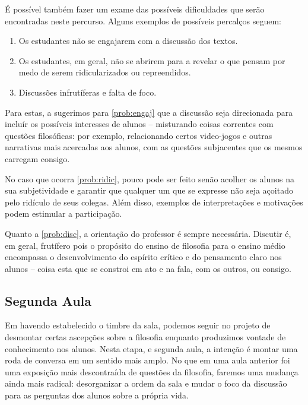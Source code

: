 \documentclass[12pt,a4paper]{article}
\begin{document}
	É possível também fazer um exame das possíveis dificuldades 
	que serão encontradas neste percurso. Alguns exemplos de possíveis 
	percalços seguem:

	\begin{enumerate}[label=\alph*)]
		\item	\label{prob:engaj} 
			Os estudantes não se engajarem com a discussão 
			dos textos.

		\item	\label{prob:ridic}
			Os estudantes, em geral, não se abrirem para a 
			revelar o que pensam por medo de serem ridicularizados
			ou repreendidos.

		\item	\label{prob:disc}
			Discussões infrutíferas e falta de foco.
	\end{enumerate}
	
	Para estas, a sugerimos para \ref{prob:engaj} que a discussão
	seja direcionada para incluír os possíveis interesses de alunos
	-- misturando coisas correntes com questões filosóficas: por
	exemplo, relacionando certos video-jogos e outras narrativas 
	mais acercadas aos alunos, com as questões subjacentes que os 
	mesmos carregam consigo. 
	
	No caso que ocorra \ref{prob:ridic}, pouco pode ser feito senão
	acolher os alunos na sua subjetividade e garantir que qualquer 
	um que se expresse não seja açoitado pelo ridículo de seus 
	colegas. Além disso, exemplos de interpretações e motivações 
	podem estimular a participação.

	Quanto a \ref{prob:disc}, a orientação do professor é sempre
	necessária. Discutir é, em geral, frutífero pois o propósito
	do ensino de filosofia para o ensino médio encompassa o 
	desenvolvimento do espírito crítico e do pensamento claro nos 
	alunos -- coisa esta que se constroi em ato e na fala, com os 
	outros, ou consigo.

	\subsection*{Segunda Aula}

	Em havendo estabelecido o timbre da sala, podemos seguir no 
	projeto de desmontar certas ascepções sobre a filosofia 
	enquanto produzimos vontade de conhecimento nos alunos. Nesta
	etapa, e segunda aula, a intenção é montar uma roda de conversa
	em um sentido mais amplo. No que em uma aula anterior foi uma 
	exposição mais descontraída de questões da filosofia, faremos 
	uma mudança ainda mais radical: desorganizar a ordem da sala e 
	mudar o foco da discussão para as perguntas dos alunos sobre 
	a própria vida. 
\end{document}
